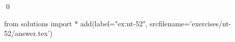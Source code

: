 
\begin{ex} 
  \label{ex:nt-52}
  
  \qed
\end{ex} 
\begin{python0}
from solutions import *
add(label="ex:nt-52",
    srcfilename='exercises/nt-52/answer.tex') 
\end{python0}
